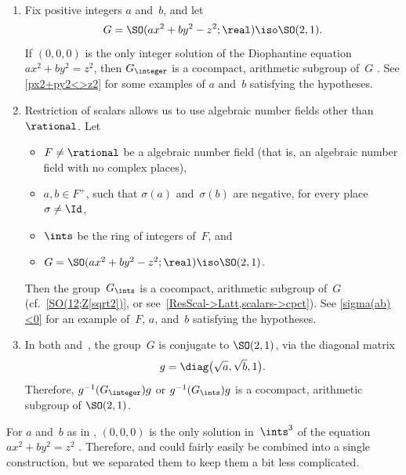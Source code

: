 \begin{egs} \label{ArithSO21Eg} \ 
\noprelistbreak
 \begin{enumerate}
 \item \label{ArithSO21Eg-Q}
 Fix positive integers $a$ and~$b$, and let 
 $$G = \SO(a x^2 + b y^2 - z^2; \real) \iso
\SO(2,1) .$$
 If $(0,0,0)$ is the only integer solution of the
Diophantine equation $a x^2 + b y^2 = z^2$, then
$G_{\integer}$ is a cocompact, arithmetic subgroup of~$G$
. See \cref{px2+py2<>z2} for some
examples of $a$ and~$b$ satisfying the hypotheses.
 \item Restriction of scalars 
allows us to use algebraic number fields other
than~$\rational$. Let
 \begin{itemize}
 \item \label{ArithSO21Eg-F}
 $F \neq \rational$ be a  algebraic number field (that is, an
algebraic number field with no complex places),
 \item $a,b \in F^+$, such that $\sigma(a)$ and~$\sigma(b)$
are negative, for every place $\sigma \neq \Id$,
 \item $\ints$ be the ring of integers of~$F$, and
 \item $G = \SO(a x^2 + b y^2 - z^2; \real) \iso
\SO(2,1)$. 
 \end{itemize}
 Then the group~$G_{\ints}$ is a cocompact, arithmetic subgroup
of~$G$ (cf.~\cref{SO(12;Z[sqrt2])}, or
see~\cref{ResScal->Latt,scalars->cpct}). See
\cref{sigma(ab)<0} for an example of~$F$, $a$,
and~$b$ satisfying the hypotheses.
 \item In both 
and~, the group~$G$ is conjugate to
$\SO(2,1)$, via the diagonal matrix 
 $$ g = \diag \bigl( \sqrt{a}, \sqrt{b}, 1 \bigr) .$$
 Therefore, $g^{-1} (G_{\integer}) g$ or $g^{-1}
(G_{\ints}) g$ is a cocompact, arithmetic subgroup of
$\SO(2,1)$.
 \end{enumerate}
 \end{egs}

\begin{rem} 
 For $a$ and~$b$ as in , $(0,0,0)$
is the only solution in~$\ints^3$ of the equation
$ax^2 + by^2 = z^2$ .
Therefore,  and
 could fairly easily be combined into a
single construction, but we separated them to keep them a bit less complicated.
 \end{rem}


